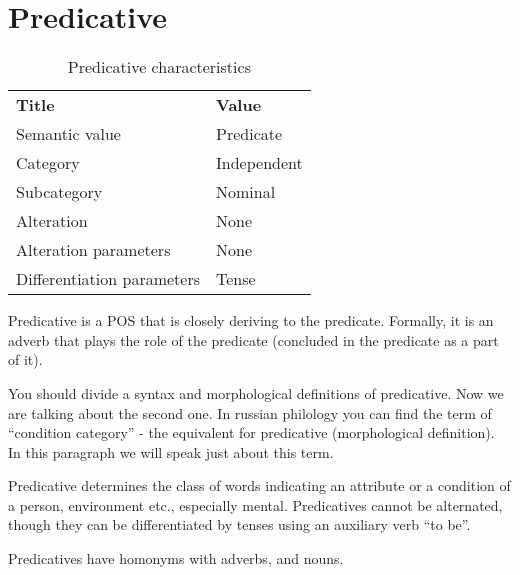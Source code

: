 \section{Predicative}

\begin{table}[!htb]
	\caption{Predicative characteristics}
	\begin{tabular}{ll}
		\textbf{Title}              & \textbf{Value}                            \\
		Semantic value              & Predicate                                 \\
		Category                    & Independent                               \\
		Subcategory                 & Nominal                                   \\
		Alteration                  & None                                      \\
		Alteration parameters       & None                                      \\
		Differentiation parameters  & Tense                                  
	\end{tabular}
\end{table}

Predicative is a POS that is closely deriving to the predicate. Formally, it is an adverb that plays the role of the predicate (concluded in the predicate as a part of it). 

You should divide a syntax and morphological definitions of predicative. Now we are talking about the second one. In russian philology you can find the term of “condition category” - the equivalent for predicative (morphological definition). In this paragraph we will speak just about this term.

Predicative determines the class of words indicating an attribute or a condition of a person, environment etc., especially mental. Predicatives cannot be alternated, though they can be differentiated by tenses using an auxiliary verb “to be”. 

Predicatives have homonyms with adverbs, and nouns.  
